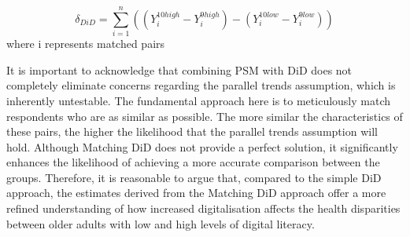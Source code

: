 \begin{enumerate}[wide=0pt, leftmargin=*, labelwidth=0pt, labelindent=\parindent, itemindent=0pt]
    \begin{equation}
        \label{eq:did}
        \delta_{DiD} = \sum_{i=1}^{n} \left( (Y_{i}^{10high} - Y_{i}^{9high}) - (Y_{i}^{10low} - Y_{i}^{9low}) \right)
    \end{equation}
    where i represents matched pairs
\end{enumerate}

It is important to acknowledge that combining PSM with DiD does not completely eliminate concerns regarding the parallel trends assumption, which is inherently untestable. The fundamental approach here is to meticulously match respondents who are as similar as possible. The more similar the characteristics of these pairs, the higher the likelihood that the parallel trends assumption will hold. Although Matching DiD does not provide a perfect solution, it significantly enhances the likelihood of achieving a more accurate comparison between the groups. Therefore, it is reasonable to argue that, compared to the simple DiD approach, the estimates derived from the Matching DiD approach offer a more refined understanding of how increased digitalisation affects the health disparities between older adults with low and high levels of digital literacy.